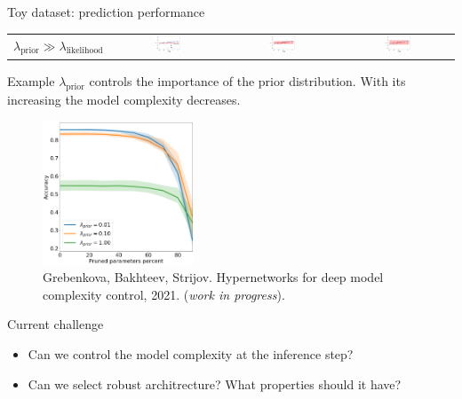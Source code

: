 \documentclass[usenames,dvipsnames,11pt,pdf,utf8,russian,aspectratio=169]{beamer}
\begin{document}
\begin{frame}{Toy dataset: prediction performance}
\begin{table}
\begin{tabular}{cccc}
          $\lambda_\text{prior} \gg \lambda_\text{likelihood}$   & \includegraphics[width=0.25\textwidth]{plot_0_2kld.png} & \includegraphics[width=0.25\textwidth]{plot_1kld.png} & \includegraphics[width=0.25\textwidth]{plot_10kld.png}\\
        \end{tabular}

    \end{table}
    
    
\end{frame}



\begin{frame}{Example}
$\lambda_\text{prior}$ controls the importance of the prior distribution. With its increasing the model complexity decreases. 

\begin{figure}[h]
\includegraphics[width=0.4\textwidth]{./cifar_hyper.png}
\caption*{\footnotesize Grebenkova, Bakhteev, Strijov. Hypernetworks for deep model complexity control, 2021. (\textit{work in progress}).}
\end{figure}
\end{frame}


\begin{frame}{Current challenge}
\begin{itemize}
\item Can we control the model complexity at the inference step?
\item Can we select robust architrecture? What properties should it have?
\end{itemize}
\end{frame}
\end{document}
